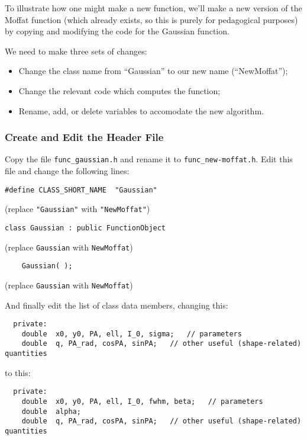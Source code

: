 \documentclass[10pt]{article}
\begin{document}
To illustrate how one might make a new function, we'll make a new version of
the Moffat function (which already exists, so this is purely for pedagogical purposes)
by copying and modifying the code for the Gaussian function.

\bigskip

We need to make three sets of changes:
\begin{itemize}
\item Change the class name from ``Gaussian'' to our new name (``NewMoffat'');
\item Change the relevant code which computes the function;
\item Rename, add, or delete variables to accomodate the new algorithm.
\end{itemize}


\subsubsection{Create and Edit the Header File}

Copy the file \texttt{func\_gaussian.h} and rename it to \texttt{func\_new-moffat.h}. 
Edit this file and change the following lines:

\begin{verbatim}
#define CLASS_SHORT_NAME  "Gaussian"
\end{verbatim} 
(replace \texttt{"Gaussian"} with \texttt{"NewMoffat"})

\begin{verbatim}
class Gaussian : public FunctionObject
\end{verbatim}
(replace \texttt{Gaussian} with \texttt{NewMoffat})

\begin{verbatim}
    Gaussian( );
\end{verbatim}
(replace \texttt{Gaussian} with \texttt{NewMoffat})

And finally edit the list of class data members, changing this:
\begin{verbatim}
  private:
    double  x0, y0, PA, ell, I_0, sigma;   // parameters
    double  q, PA_rad, cosPA, sinPA;   // other useful (shape-related) quantities
\end{verbatim}
to this:
\begin{verbatim}
  private:
    double  x0, y0, PA, ell, I_0, fwhm, beta;   // parameters
    double  alpha;
    double  q, PA_rad, cosPA, sinPA;   // other useful (shape-related) quantities
\end{verbatim}
\end{document}
